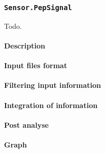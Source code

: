 
\subsubsection{\texttt{Sensor.PepSignal}}

Todo.

\paragraph{Description}


\paragraph{Input files format}

\paragraph{Filtering input information}


\paragraph{Integration of information}


\paragraph{Post analyse}


\paragraph{Graph}


